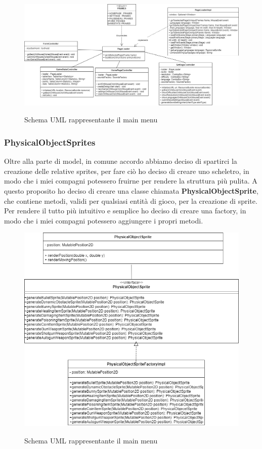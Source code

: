 \begin{figure}[H]
	\centering{}
	\includegraphics[width=480pt]{img/main_menu}
	\label{img:main_menu.png}
	\caption{Schema UML rappresentante il main menu\\}
\end{figure}

\newpage

\subsubsection{PhysicalObjectSprites}

Oltre alla parte di model, in comune accordo abbiamo deciso di spartirci la creazione delle relative sprites, per fare ciò ho deciso di creare uno scheletro, in modo che i miei compagni potessero fruirne per rendere la struttura più pulita. A questo proposito ho deciso di creare una classe chiamata \textbf{PhysicalObjectSprite}, che contiene metodi, validi per qualsiasi entità di gioco, per la creazione di sprite. Per rendere il tutto più intuitivo e semplice ho deciso di creare una factory, in modo che i miei compagni potessero aggiungere i propri metodi.

\begin{figure}[H]
	\centering{}
	\includegraphics[width=\textwidth]{img/PhysicalObjectSprites.drawio}
	\label{img:PhysicalObjectSprites.drawio.png}
	\caption{Schema UML rappresentante il main menu\\}
\end{figure}

